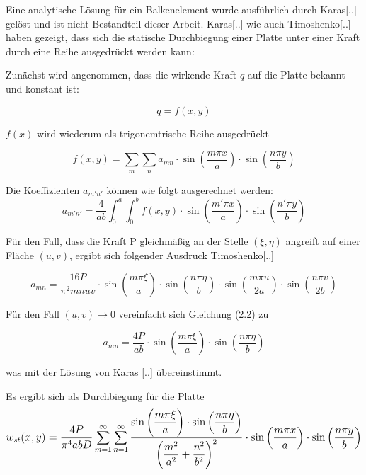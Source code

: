 Eine analytische Lösung für ein Balkenelement wurde ausführlich durch Karas[..] gelöst und ist nicht Bestandteil dieser Arbeit.
Karas[..] wie auch Timoshenko[..] haben gezeigt, dass sich die statische Durchbiegung einer Platte unter einer Kraft durch eine Reihe ausgedrückt werden kann:


Zunächst wird angenommen, dass die wirkende Kraft $q$ auf die Platte bekannt und konstant ist:

$$q = f(x,y)$$

$f(x)$ wird wiederum als trigonemtrische Reihe ausgedrückt

\begin{equation} 
\tag{$m,n = 1, 2, 3, 4, ...$}f(x,y) = \sum_m \sum_n a_{mn} \cdot \sin\left(\dfrac{m \pi x}{a}\right) \cdot \sin\left(\dfrac{n \pi y}{b}\right)
\end{equation} 

Die Koeffizienten $a_{m'n'}$ können wie folgt ausgerechnet werden:
\begin{equation}
a_{m'n'} = \dfrac{4}{ab} \int_{0}^{a} \int_{0}^{b} f(x,y)\cdot \sin\left(\dfrac{m' \pi x}{a}\right) \cdot \sin\left(\dfrac{n' \pi y}{b}\right)
\end{equation}



Für den Fall, dass die Kraft P gleichmäßig an der Stelle $(\xi, \eta)$ angreift auf einer Fläche $(u,v)$, ergibt sich folgender Ausdruck Timoshenko[..]



\begin{equation}
a_{mn} = \dfrac{16P}{\pi^2 m n u v} 
\cdot \sin\left(\dfrac{m \pi \xi}{a}\right) 
\cdot \sin\left(\dfrac{n \pi \eta}{b}\right) 
\cdot \sin\left(\dfrac{m \pi u}{2a}\right) 
\cdot \sin\left(\dfrac{n \pi v}{2b}\right)
\end{equation}

Für den Fall $(u,v)\rightarrow 0$ vereinfacht sich Gleichung (2.2) zu

\begin{equation}
a_{mn} = \dfrac{4P}{a b} 
\cdot \sin\left(\dfrac{m \pi \xi}{a}\right) 
\cdot \sin\left(\dfrac{n \pi \eta}{b}\right) 
\end{equation}

was mit der Lösung von Karas [..] übereinstimmt.



Es ergibt sich als Durchbiegung für die Platte
\begin{equation}
\mathlarger{
w_{st}(x,y) = \dfrac{4P}{\pi^4 a b D} 
\sum_{m = 1}^{\infty} \sum_{n = 1}^{\infty}
\dfrac{
	\sin\left(\dfrac{m \pi \xi}{a}\right) 
	\cdot \sin\left(\dfrac{n \pi \eta}{b}\right) 
}{
	\left( 
	\dfrac{m^2}{a^2} +
	\dfrac{n^2}{b^2}
	\right)^2
}
\cdot \sin\left(\dfrac{m \pi x}{a}\right) 
\cdot \sin\left(\dfrac{n \pi y}{b}\right) 
}
\end{equation}



